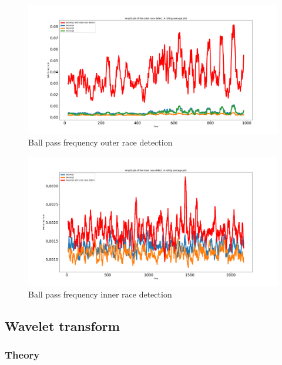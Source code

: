 \documentclass[11pt, oneside]{article}   	%
\begin{document}
\begin{figure}[H] %
   \centering
   \includegraphics[width=7in]{signal_processing_method_bpfo} 
   \caption{Ball pass frequency outer race detection}
   \label{fig:signal111}
\end{figure}

\begin{figure}[H] %
   \centering
   \includegraphics[width=7in]{signal_processing_method_bpfi} 
   \caption{Ball pass frequency inner race detection}
   \label{fig:signal222}
\end{figure}






\subsection{Wavelet transform}
\subsubsection{Theory}
\end{document}
